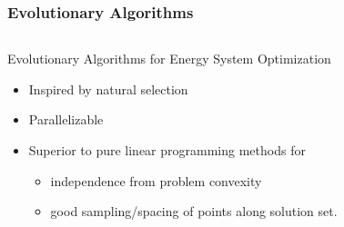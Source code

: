 \begin{frame}
    \frametitle{Evolutionary Algorithms}

    \begin{columns}
        \column[t]{6cm}
        \begin{block}{Evolutionary Algorithms for Energy System Optimization}
            \begin{itemize}
            \item Inspired by natural selection
            \item Parallelizable
            \item Superior to pure linear programming methods for
                \begin{itemize}
                    \item independence from problem convexity
                    \item good sampling/spacing of points along solution set.
                \end{itemize}
            \end{itemize}
            

\end{block}
\end{columns}
\end{frame}

